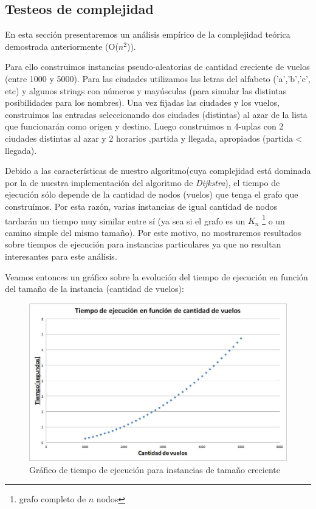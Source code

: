 \documentclass[11pt, a4paper, twoside]{article}
\begin{document}
\subsection{Testeos de complejidad}
En esta sección presentaremos un análisis empírico de la complejidad teórica demostrada anteriormente (O($n^2$)). 

Para ello construimos instancias pseudo-aleatorias de cantidad creciente de vuelos (entre 1000 y 5000). Para las ciudades utilizamos las letras del alfabeto ('a','b','c', etc) y algunos strings con números y mayúsculas (para simular las distintas posibilidades para los nombres). Una vez fijadas las ciudades y los vuelos, construimos las entradas seleccionando dos ciudades (distintas) al azar de la lista que funcionarán como origen y destino. Luego construimos n 4-uplas con 2 ciudades distintas al azar y 2 horarios ,partida y llegada, apropiados (partida < llegada).

Debido a las características de nuestro algoritmo(cuya complejidad está dominada por la de nuestra implementación del algoritmo de \textit{Dijkstra}), el tiempo de ejecución sólo depende de la cantidad de nodos (vuelos) que tenga el grafo que construímos. Por esta razón, varias instancias de igual cantidad de nodos tardarán un tiempo muy similar entre sí (ya sea si el grafo es un $K_n$ \footnote{grafo completo de $n$ nodos} o un camino simple del mismo tamaño). Por este motivo, no mostraremos resultados sobre tiempos de ejecución para instancias particulares ya que no resultan interesantes para este análisis.

Veamos entonces un gráfico sobre la evolución del tiempo de ejecución en función del tamaño de la instancia (cantidad de vuelos):

\begin{figure}[H]
\centering
\includegraphics[scale=0.5]{imagenes/graph2.jpg}
\caption{Gráfico de tiempo de ejecución para instancias de tamaño creciente}
\end{figure}
\end{document}
